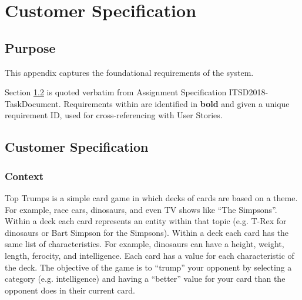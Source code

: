 \newpage
\section{Customer Specification}
\label{appendix:customer_specification}

\newcommand{\creq}[1]{
    [\textbf{C\arabic{cReqNum}: #1}]%
    \addtocounter{cReqNum}{10}%
}

\newcommand{\areq}[1]{
    [\textbf{A\arabic{aReqNum}: #1}]%
    \addtocounter{aReqNum}{10}%
}

\subsection{Purpose}

This appendix captures the foundational requirements of the system.

Section \ref{contract} is quoted verbatim from Assignment Specification ITSD2018-TaskDocument.
Requirements within are identified in \textbf{bold} and given a unique requirement ID, used for cross-referencing with User Stories.

\subsection{Customer Specification} \label{contract}
\setcounter{cReqNum}{1000}
\subsubsection{Context}
Top Trumps is a simple card game in which decks of cards are based on a theme.
For example, race cars, dinosaurs, and even TV shows like ``The Simpsons''.
Within a deck each card represents an entity within that topic (e.g. T-Rex for dinosaurs or Bart Simpson for the Simpsons).
Within a deck each card has the same list of characteristics.
For example, dinosaurs can have a height, weight, length, ferocity, and intelligence.
Each card has a value for each characteristic of the deck.
The objective of the game is to ``trump'' your opponent by selecting a category (e.g. intelligence) and having a ``better'' value for your card than the opponent does in their current card.


